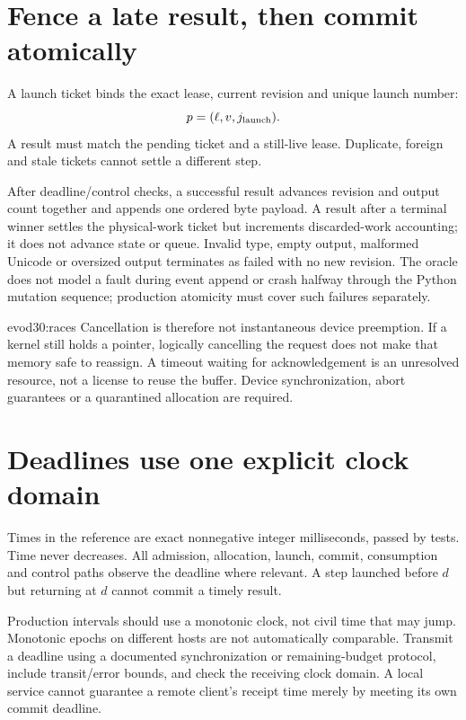 \section{Fence a late result, then commit atomically}
A launch ticket binds the exact lease, current revision and unique launch number:
\[
 p=(\ell,v,j_{\rm launch}).
\]
A result must match the pending ticket and a still-live lease. Duplicate,
foreign and stale tickets cannot settle a different step.
\par\medskip\noindent\begin{minipage}{\linewidth}
\end{minipage}\par\medskip
After deadline/control checks, a successful result advances revision and output
count together and appends one ordered byte payload. A result after a terminal
winner settles the physical-work ticket but increments discarded-work accounting;
it does not advance state or queue.
Invalid type, empty output, malformed Unicode or oversized output terminates as
failed with no new revision. The oracle does not model a fault during event append
or crash halfway through the Python mutation sequence; production atomicity must
cover such failures separately.

{evod30:races}
Cancellation is therefore not instantaneous device preemption.
If a kernel still holds a pointer, logically cancelling the request does not make
that memory safe to reassign. A timeout waiting for acknowledgement is an unresolved
resource, not a license to reuse the buffer. Device synchronization, abort guarantees
or a quarantined allocation are required.

\section{Deadlines use one explicit clock domain}
Times in the reference are exact nonnegative integer milliseconds, passed by tests.
Time never decreases. All admission, allocation, launch, commit, consumption and
control paths observe the deadline where relevant. A step launched before $d$
but returning at $d$ cannot commit a timely result.

Production intervals should use a monotonic clock, not civil time that may jump.
Monotonic epochs on different hosts are not automatically comparable. Transmit
a deadline using a documented synchronization or remaining-budget protocol,
include transit/error bounds, and check the receiving clock domain.
A local service cannot guarantee a remote client's receipt time merely by meeting
its own commit deadline.

